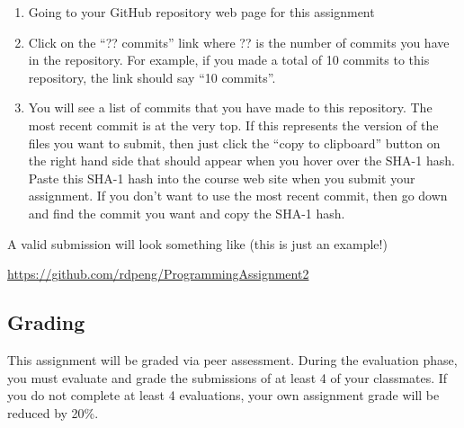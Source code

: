\documentclass[
]{article}
\providecommand{\tightlist}{%
  \setlength{\itemsep}{0pt}\setlength{\parskip}{0pt}}
\begin{document}
\begin{enumerate}
\def\labelenumi{\arabic{enumi}.}
\tightlist
\item
  Going to your GitHub repository web page for this assignment
\item
  Click on the ``?? commits'' link where ?? is the number of commits you
  have in the repository. For example, if you made a total of 10 commits
  to this repository, the link should say ``10 commits''.
\item
  You will see a list of commits that you have made to this repository.
  The most recent commit is at the very top. If this represents the
  version of the files you want to submit, then just click the ``copy to
  clipboard'' button on the right hand side that should appear when you
  hover over the SHA-1 hash. Paste this SHA-1 hash into the course web
  site when you submit your assignment. If you don't want to use the
  most recent commit, then go down and find the commit you want and copy
  the SHA-1 hash.
\end{enumerate}

A valid submission will look something like (this is just an example!)

\url{https://github.com/rdpeng/ProgrammingAssignment2}

\hypertarget{grading}{%
\subsection{Grading}\label{grading}}

This assignment will be graded via peer assessment. During the
evaluation phase, you must evaluate and grade the submissions of at
least 4 of your classmates. If you do not complete at least 4
evaluations, your own assignment grade will be reduced by 20\%.
\end{document}
